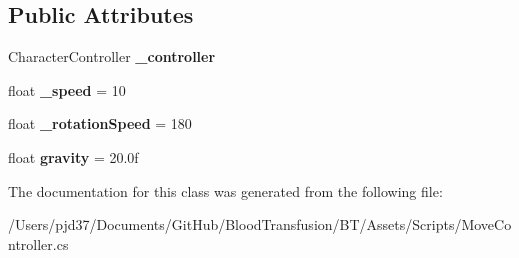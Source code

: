 \subsection*{Public Attributes}
\begin{DoxyCompactItemize}
\item 
Character\+Controller {\bfseries \+\_\+controller}\hypertarget{class_move_controller_ad4af6a69aabdfad3a87bcd4825559063}{}\label{class_move_controller_ad4af6a69aabdfad3a87bcd4825559063}

\item 
float {\bfseries \+\_\+speed} = 10\hypertarget{class_move_controller_aa08d98e13e82a97bcf999970a5f8a62e}{}\label{class_move_controller_aa08d98e13e82a97bcf999970a5f8a62e}

\item 
float {\bfseries \+\_\+rotation\+Speed} = 180\hypertarget{class_move_controller_a40c01980d208150fd6407839cb15b7ed}{}\label{class_move_controller_a40c01980d208150fd6407839cb15b7ed}

\item 
float {\bfseries gravity} = 20.\+0f\hypertarget{class_move_controller_a45baeccc20f8d00e81febbbfb323378b}{}\label{class_move_controller_a45baeccc20f8d00e81febbbfb323378b}

\end{DoxyCompactItemize}


The documentation for this class was generated from the following file\+:\begin{DoxyCompactItemize}
\item 
/\+Users/pjd37/\+Documents/\+Git\+Hub/\+Blood\+Transfusion/\+B\+T/\+Assets/\+Scripts/Move\+Controller.\+cs\end{DoxyCompactItemize}
